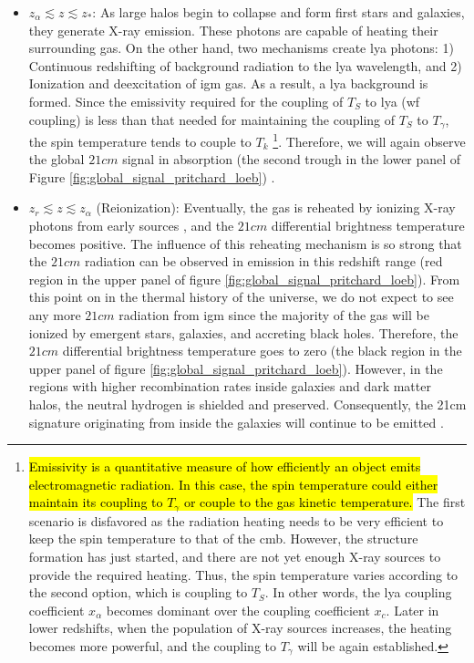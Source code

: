 \documentclass[12pt, TexShade, letterpaper]{report}
\begin{document}
\begin{itemize}
\item $z_\alpha \lesssim z \lesssim z_*$: As large halos begin to collapse and form first stars and galaxies, they generate X-ray emission. These photons are capable of heating their surrounding gas. On the other hand, two mechanisms create \gls{lya} photons: 1) Continuous redshifting of background radiation to the \gls{lya} wavelength, and 2) Ionization and deexcitation of \gls{igm} gas. As a result, a \gls{lya} background is formed. Since the emissivity required for the coupling of $T_S$ to \gls{lya} (\gls{wf} coupling) is less than that needed for maintaining the coupling of $T_S$ to $T_\gamma$, the spin temperature tends to couple to $T_k$ \footnote{\hl{Emissivity is a quantitative measure of how efficiently an object emits electromagnetic radiation. In this case, the spin temperature could either maintain its coupling to $T_\gamma$ or couple to the gas kinetic temperature.} The first scenario is disfavored as the radiation heating needs to be very efficient to keep the spin temperature to that of the \gls{cmb}. However, the structure formation has just started, and there are not yet enough X-ray sources to provide the required heating. Thus, the spin temperature varies according to the second option, which is coupling to $T_S$. In other words, the \gls{lya} coupling coefficient $x_\alpha$ becomes dominant over the coupling coefficient $x_c$. Later in lower redshifts, when the population of X-ray sources increases, the heating becomes more powerful, and the coupling to $T_\gamma$ will be again established.}. Therefore, we will again observe the global $21cm$ signal in absorption (the second trough in the lower panel of Figure \ref{fig:global_signal_pritchard_loeb}) \cite{map_universe, 21century}.\par

\item $z_r \lesssim z \lesssim z_\alpha$ (Reionization): Eventually, the gas is reheated by ionizing X-ray photons from early sources \cite{21century}, and the $21cm$ differential brightness temperature becomes positive. The influence of this reheating mechanism is so strong that the $21cm$ radiation can be observed in emission in this redshift range (red region in the upper panel of figure \ref{fig:global_signal_pritchard_loeb}). From this point on in the thermal history of the universe, we do not expect to see any more $21cm$ radiation from \gls{igm} since the majority of the gas will be ionized by emergent stars, galaxies, and accreting black holes. Therefore, the $21cm$ differential brightness temperature goes to zero (the black region in the upper panel of figure \ref{fig:global_signal_pritchard_loeb}). However, in the regions with higher recombination rates inside galaxies and dark matter halos, the neutral hydrogen is shielded and preserved. Consequently, the 21cm signature originating from inside the galaxies will continue to be emitted \cite{map_universe, 21century}.\par
\end{itemize}
\end{document}
